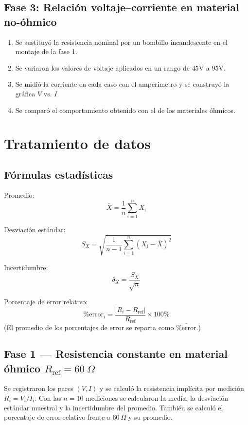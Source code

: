 \documentclass[11pt,twocolumn]{article}
\begin{document}
\subsection*{Fase 3: Relación voltaje--corriente en material no-óhmico}
\begin{enumerate}
    \item Se sustituyó la resistencia nominal por un bombillo incandescente en el montaje de la fase 1.
    \item Se variaron los valores de voltaje aplicados en un rango de $45 \text{V}$ a $95 \text{V}$.
    \item Se midió la corriente en cada caso con el amperímetro y se construyó la gráfica $V$ vs. $I$.
    \item Se comparó el comportamiento obtenido con el de los materiales óhmicos.
\end{enumerate}

\section{Tratamiento de datos}

\subsection*{Fórmulas estadísticas}
Promedio:
\[
\bar{X}=\frac{1}{n}\sum_{i=1}^{n} X_i
\]

Desviación estándar:
\[
S_X=\sqrt{\frac{1}{n-1}\sum_{i=1}^{n}(X_i-\bar{X})^2}
\]

Incertidumbre:
\[
\delta_{\bar{X}}=\frac{S_X}{\sqrt{n}}
\]

Porcentaje de error relativo:
\[
\%\mathrm{error}_i = \frac{\lvert R_i - R_{\mathrm{ref}}\rvert}{R_{\mathrm{ref}}}\times 100\%
\]
(El promedio de los porcentajes de error se reporta como \(\overline{\%\mathrm{error}}\).)

\subsection*{Fase 1 — Resistencia constante en material óhmico $R_{\mathrm{ref}} = 60\ \Omega$}

Se registraron los pares $(V,I)$ y se calculó la resistencia implícita por medición \(R_i=V_i/I_i\). Con las \(n=10\) mediciones se calcularon la media, la desviación estándar muestral y la incertidumbre del promedio. También se calculó el porcentaje de error relativo frente a \(60\ \Omega\) y su promedio.
\end{document}
